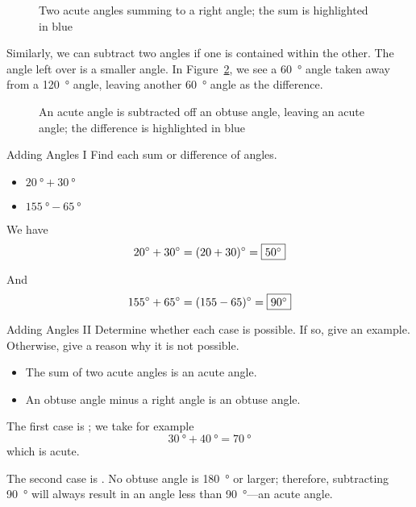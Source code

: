 \documentclass[a4paper,10pt]{report}
\begin{document}
\begin{figure}

 \caption{Two acute angles summing to a right angle; the sum is highlighted in
 blue}
 \label{an:acutesum}
\end{figure}

Similarly, we can subtract two angles if one is contained within the other. The
angle left over is a smaller angle. In Figure~\ref{an:obtusediff}, we see a
\SI{60}{\degree} angle taken away from a \SI{120}{\degree} angle, leaving
another \SI{60}{\degree} angle as the difference.

\begin{figure}

 \caption{An acute angle is subtracted off an obtuse angle, leaving an acute
 angle; the difference is highlighted in blue}
 \label{an:obtusediff}
\end{figure}

\begin{problem}{Adding Angles I}
  Find each sum or difference of angles.

  \begin{itemize}
    \item $\SI{20}{\degree} + \SI{30}{\degree}$
    \item $\SI{155}{\degree} - \SI{65}{\degree}$
  \end{itemize}

  \begin{solution}
    We have \[ \SI{20}{\degree} + \SI{30}{\degree} = (20+30)\si{\degree} =
    \Ans{\SI{50}{\degree}} \]

    And \[ \SI{155}{\degree} + \SI{65}{\degree} =
    (155-65)\si{\degree} = \Ans{\SI{90}{\degree}} \]
  \end{solution}
\end{problem}

\begin{problem}{Adding Angles II}
  Determine whether each case is possible. If so, give an example. Otherwise,
  give a reason why it is not possible.

  \begin{itemize}
    \item The sum of two acute angles is an acute angle.
    \item An obtuse angle minus a right angle is an obtuse angle.
  \end{itemize}

  \begin{solution}
    The first case is ; we take for example \[
      \SI{30}{\degree} + \SI{40}{\degree} = \SI{70}{\degree}
    \] which is acute.

    The second case is . No obtuse angle is \SI{180}{\degree}
    or larger; therefore, subtracting \SI{90}{\degree} will always result in an
    angle less than \SI{90}{\degree}---an acute angle.
  \end{solution}
\end{problem}
\end{document}
